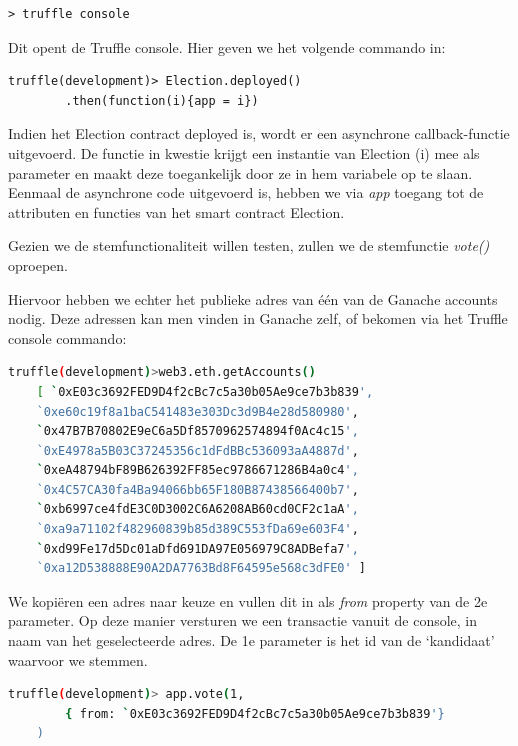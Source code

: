 	\begin{lstlisting}[numbers=none]
	> truffle console
	\end{lstlisting}
	
	Dit opent de Truffle console. 
	Hier geven we het volgende commando in:

	\begin{lstlisting}[numbers=none]
	truffle(development)> Election.deployed()
		.then(function(i){app = i})
	\end{lstlisting}
	
	Indien het Election contract deployed is, wordt er een asynchrone callback-functie uitgevoerd.  De functie in kwestie krijgt  een instantie van Election (i) mee als parameter en maakt deze toegankelijk door ze in hem variabele op te slaan.
	Eenmaal de asynchrone code uitgevoerd is, hebben we via \textit{app} toegang tot de attributen en functies van het smart contract Election.
	
	Gezien we de stemfunctionaliteit willen testen, zullen we de stemfunctie \textit{vote()} oproepen.
	
	Hiervoor hebben we echter het publieke adres van één van de Ganache accounts nodig. Deze adressen kan men vinden in Ganache zelf, of bekomen via het Truffle console commando:
	\begin{lstlisting}[numbers=none,language=bash]
	truffle(development)>web3.eth.getAccounts()
	[ `0xE03c3692FED9D4f2cBc7c5a30b05Ae9ce7b3b839',
	`0xe60c19f8a1baC541483e303Dc3d9B4e28d580980',
	`0x47B7B70802E9eC6a5Df8570962574894f0Ac4c15',
	`0xE4978a5B03C37245356c1dFdBBc536093aA4887d',
	`0xeA48794bF89B626392FF85ec9786671286B4a0c4',
	`0x4C57CA30fa4Ba94066bb65F180B87438566400b7',
	`0xb6997ce4fdE3C0D3002C6A6208AB60cd0CF2c1aA',
	`0xa9a71102f482960839b85d389C553fDa69e603F4',
	`0xd99Fe17d5Dc01aDfd691DA97E056979C8ADBefa7',
	`0xa12D538888E90A2DA7763Bd8F64595e568c3dFE0' ]
	\end{lstlisting}
	
	We kopiëren een adres naar keuze en vullen dit in als \textit{from} property van de 2e parameter. Op deze manier versturen we een transactie vanuit de console, in naam van het geselecteerde adres. De 1e parameter is het id van de `kandidaat' waarvoor we stemmen.
	\begin{lstlisting}[numbers=none,language=bash]
	truffle(development)> app.vote(1,
		{ from: `0xE03c3692FED9D4f2cBc7c5a30b05Ae9ce7b3b839'}
	)
	\end{lstlisting}
	
